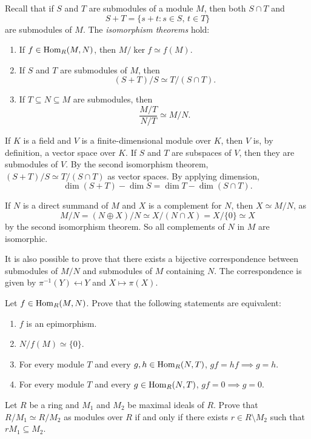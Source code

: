Recall that if $S$ and $T$ are submodules of a module $M$, then 
both $S\cap T$ and 
\[
S+T=\{s+t:s\in S,\,t\in T\}
\]
are submodules of $M$. 
The \emph{isomorphism theorems} hold:
\begin{enumerate}
	\item If $f\in\operatorname{Hom}_R(M,N)$, then $M/\ker f\simeq f(M)$.
	\item If $S$ and $T$ are submodules of $M$, then 
    \[
    (S+T)/S\simeq T/(S\cap T).
    \]
	\item If $T\subseteq N\subseteq M$ are submodules, then  
	\[
	\frac{M/T}{N/T}\simeq M/N.
	\]
\end{enumerate}

\begin{example}
If $K$ is a field and $V$ is a finite-dimensional 
module over $K$, then $V$ is, by definition, a vector space over $K$. 
If $S$ and $T$ are subspaces of $V$, then they are submodules of $V$. 
By the second isomorphism theorem, $(S+T)/S\simeq T/(S\cap T)$ 
as vector spaces. By applying dimension,  
\[
\dim(S+T)-\dim S=\dim T-\dim(S\cap T).
\]
\end{example}

\begin{example}
If $N$ is a direct summand of $M$ and $X$ is a complement for $N$, then $X\simeq M/N$, as
\[
M/N=(N\oplus X)/N\simeq X/(N\cap X)=X/\{0\}\simeq X
\]
by the second isomorphism theorem. So all complements of $N$ in $M$ are isomorphic. 
\end{example}

It is also possible to prove that there exists a bijective correspondence between
submodules of $M/N$ and submodules of $M$ containing $N$. The correspondence is given by 
$\pi^{-1}(Y)\mapsfrom Y$ and $X\mapsto \pi(X)$. 

\begin{exercise}
Let $f\in\operatorname{Hom}_R(M,N)$. Prove that the following statements are equivalent: 
\begin{enumerate}
\item $f$ is an epimorphism.
\item $N/f(M)\simeq\{0\}$. 
\item For every module $T$ and every $g,h\in\operatorname{Hom}_R(N,T)$, $g f=h f\implies g=h$.
\item For every module $T$ and every $g\in\operatorname{Hom}_R(N,T)$, $g f=0\implies g=0$. 
\end{enumerate}
\end{exercise}

\begin{exercise}
\label{xca:mod_iso_max}
    Let $R$ be a ring and $M_1$ and $M_2$ be maximal ideals of $R$. Prove
    that $R/M_1\simeq R/M_2$ as modules over $R$ if and only if there exists
    $r\in R\setminus M_2$ such that $rM_1\subseteq M_2$. 
\end{exercise}





